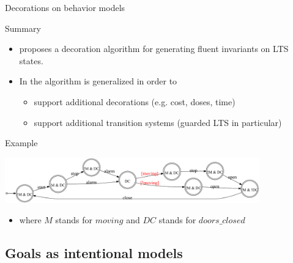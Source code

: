 \documentclass[11pt]{beamer}
\begin{document}
\begin{frame}{Decorations on behavior models}
	\begin{block}{Summary}
		\begin{itemize}
			\item \cite{Damas05} proposes a decoration algorithm for generating fluent invariants on LTS states.
			\item In \cite{Damas10} the algorithm is generalized in order to 
				\begin{itemize}
					\item support additional decorations (e.g. cost, doses, time)
					\item support additional transition systems (guarded LTS in particular)
				\end{itemize}
		\end{itemize}
	\end{block}	
	\begin{block}{Example}
		\begin{center} 
			\includegraphics[width=11cm]{Train_guarded_LTS_decorated.pdf}
		\end{center}
		\vspace{-0.5cm}
		\begin{itemize}
			\item where $M$ stands for $moving$ and $DC$ stands for $doors\_closed$
		\end{itemize}
	\end{block}
\end{frame}

\subsection{Goals as intentional models}
\end{document}
